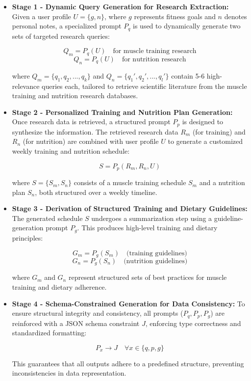 \documentclass[conference]{IEEEtran}
\begin{document}
\begin{itemize}
    \item \textbf{Stage 1 - Dynamic Query Generation for Research Extraction:}  
    Given a user profile $U = \{g, n\}$, where $g$ represents fitness goals and $n$ denotes personal notes, a specialized prompt $P_q$ is used to dynamically generate two sets of targeted research queries:
    
    \[
    Q_m = P_q(U) \quad \text{for muscle training research}
    \]
    \[
    Q_n = P_q(U) \quad \text{for nutrition research}
    \]
    
    where $Q_m = \{q_1, q_2, ..., q_k\}$ and $Q_n = \{q_1', q_2', ..., q_l'\}$ contain 5-6 high-relevance queries each, tailored to retrieve scientific literature from the muscle training and nutrition research databases.

    \item \textbf{Stage 2 - Personalized Training and Nutrition Plan Generation:}  
    Once research data is retrieved, a structured prompt $P_p$ is designed to synthesize the information. The retrieved research data $R_m$ (for training) and $R_n$ (for nutrition) are combined with user profile $U$ to generate a customized weekly training and nutrition schedule:

    \[
    S = P_p(R_m, R_n, U)
    \]

    where $S = \{S_m, S_n\}$ consists of a muscle training schedule $S_m$ and a nutrition plan $S_n$, both structured over a weekly timeline.

    \item \textbf{Stage 3 - Derivation of Structured Training and Dietary Guidelines:}  
    The generated schedule $S$ undergoes a summarization step using a guideline-generation prompt $P_g$. This produces high-level training and dietary principles:

    \[
    G_m = P_g(S_m) \quad \text{(training guidelines)}
    \]
    \[
    G_n = P_g(S_n) \quad \text{(nutrition guidelines)}
    \]

    where $G_m$ and $G_n$ represent structured sets of best practices for muscle training and dietary adherence.

    \item \textbf{Stage 4 - Schema-Constrained Generation for Data Consistency:}  
    To ensure structural integrity and consistency, all prompts ($P_q, P_p, P_g$) are reinforced with a JSON schema constraint $J$, enforcing type correctness and standardized formatting:

    \[
    P_x \rightarrow J \quad \forall x \in \{q, p, g\}
    \]

    This guarantees that all outputs adhere to a predefined structure, preventing inconsistencies in data representation.
\end{itemize}
\end{document}
